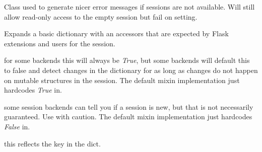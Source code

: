 \documentclass[a4paper,12pt]{sphinxmanual}
\begin{document}

\begin{fulllineitems}
\label{api:flask.sessions.NullSession}
Class used to generate nicer error messages if sessions are not
available.  Will still allow read-only access to the empty session
but fail on setting.

\end{fulllineitems}


\begin{fulllineitems}
\label{api:flask.sessions.SessionMixin}
Expands a basic dictionary with an accessors that are expected
by Flask extensions and users for the session.

\begin{fulllineitems}
\label{api:flask.sessions.SessionMixin.modified}
for some backends this will always be \emph{True}, but some backends will
default this to false and detect changes in the dictionary for as
long as changes do not happen on mutable structures in the session.
The default mixin implementation just hardcodes \emph{True} in.

\end{fulllineitems}


\begin{fulllineitems}
\label{api:flask.sessions.SessionMixin.new}
some session backends can tell you if a session is new, but that is
not necessarily guaranteed.  Use with caution.  The default mixin
implementation just hardcodes \emph{False} in.

\end{fulllineitems}


\begin{fulllineitems}
\label{api:flask.sessions.SessionMixin.permanent}
this reflects the  key in the dict.

\end{fulllineitems}


\end{fulllineitems}
\end{document}

